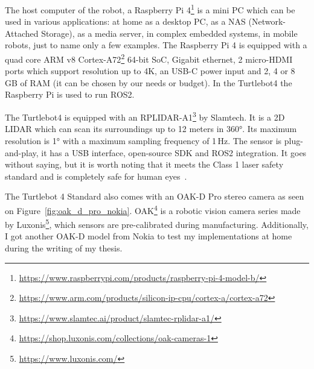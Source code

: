 The host computer of the robot, a Raspberry Pi 4\footnote{\url{https://www.raspberrypi.com/products/raspberry-pi-4-model-b/}} is a mini PC which can be used in various applications:
at home as a desktop PC,
as a NAS (Network-Attached Storage),
as a media server,
in complex embedded systems,
in mobile robots, just to name only a few examples.
The Raspberry Pi 4 is equipped with a quad core ARM v8 Cortex-A72\footnote{\url{https://www.arm.com/products/silicon-ip-cpu/cortex-a/cortex-a72}} 64-bit SoC, Gigabit ethernet, 2 micro-HDMI ports which support resolution up to 4K, an USB-C power input and 2, 4 or 8 GB of RAM (it can be chosen by our needs or budget). In the Turtlebot4 the Raspberry Pi is used to run ROS2.


The Turtlebot4 is equipped with an RPLIDAR-A1\footnote{\url{https://www.slamtec.ai/product/slamtec-rplidar-a1/}} by Slamtech. It is a 2D LIDAR which can scan its surroundings up to 12 meters in 360°. Its maximum resolution is 1° with a maximum sampling frequency of 1\,Hz.
The sensor is plug-and-play, it has a USB interface, open-source SDK and ROS2 integration. It goes without saying, but it is worth noting that it meets the Class 1 laser safety standard and is completely safe for human eyes~\cite{LaserSafety}.

The Turtlebot 4 Standard also comes with an OAK-D Pro stereo camera as seen on Figure~\ref{fig:oak_d_pro_nokia}. OAK\footnote{\url{https://shop.luxonis.com/collections/oak-cameras-1}} is a robotic vision camera series made by Luxonis\footnote{\url{https://www.luxonis.com/}}, which sensors are pre-calibrated during manufacturing. Additionally, I got another OAK-D model from Nokia to test my implementations at home during the writing of my thesis.

